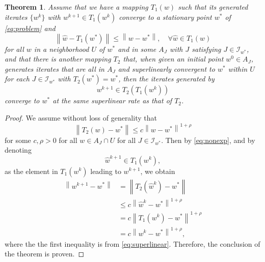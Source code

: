 \documentclass{article}
\theoremstyle{plain}
\newtheorem{theorem}{Theorem}[section]
\theoremstyle{definition}
\theoremstyle{remark}
\newcommand{\I}{\mathcal{I}}
\newcommand{\norm}[1]{{\left\|{#1}\right\|}}
\begin{document}
\begin{theorem}
\label{thm:superlinear}
Assume that we have a mapping $T_1(w)$ such that its generated
iterates $\{w^k\}$ with $w^{k+1} \in T_1(w^k)$ converge to a
stationary point $w^*$ of \cref{eq:problem} and
\begin{equation}
	\norm{\hat w - T_1(w^*)} \leq \norm{w - w^*}, \quad
	\forall \hat w \in T_1 \left( w \right)
	\label{eq:nonexp}
\end{equation}
for all $w$ in a neighborhood $U$ of $w^*$ and in some $A_J$ with $J$
satisfying $J \in \I_{w^*}$,
and that there is another mapping $T_2$ that, when given an initial
point $w^0 \in A_J$, generates iterates that are all in $A_J$ and
superlinearly convergent to $w^*$ within $U$ for each $J \in
\I_{w^*}$ with $T_2(w^*) = w^*$, then the iterates generated by
\begin{equation}
	w^{k+1} \in T_2\left(T_1\left(w^{k}\right)\right)
	\label{eq:seq}
\end{equation}
converge to $w^*$ at the same superlinear rate as that of $T_2$.
\end{theorem}
\begin{proof}
We assume without loss of generality that
\begin{equation}
	\norm{T_2(w) - w^*} \leq c \norm{w - w^*}^{1+\rho}
	\label{eq:superlinear}
\end{equation}
for some $c, \rho > 0$ for all $w \in A_J \cap U$ for all $J \in
\I_{w^*}$.
Then by \cref{eq:nonexp}, and by denoting
\[
	\hat w^{k+1} \in T_1(w^k),
\]
as the element in $T_1(w^k)$ leading to $w^{k+1}$,
we obtain
\begin{align*}
	\norm{w^{k+1} - w^*} &= \norm{T_2 \left(\hat w^k  \right) -
	w^*}\\
	&\leq  c \norm{\hat w^k - w^*}^{1+\rho}\\
	&= c \norm{T_1(w^k) - w^*}^{1+\rho} \\
	&= c \norm{w^k - w^*}^{1+\rho},
\end{align*}
where the the first inequality is from \cref{eq:superlinear}.
Therefore, the conclusion of the theorem is proven.	
\end{proof}

%
\end{document}
